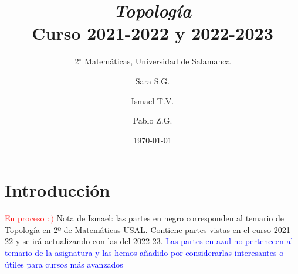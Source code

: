 \documentclass[12pt,twoside]{report}
\title{\textbf{\textit{Topología}} \\ Curso 2021-2022 y 2022-2023}
\subtitle{2$^{\circ}$ Matemáticas, Universidad de Salamanca}
\author{Sara S.G. \and Ismael T.V. \and Pablo Z.G.}
\date {\today}
\theoremstyle{azul}
\theoremstyle{azul2}
\theoremstyle{plain}
\theoremstyle{definition}
\theoremstyle{remark}
\begin{document}
\maketitle

\tableofcontents

\chapter*{Introducción}
\textcolor{red}{En proceso $:)$}\newline
Nota de Ismael: las partes en negro corresponden al temario de Topología en 2º de Matemáticas USAL. Contiene partes vistas en el curso 2021-22 y se irá actualizando con las del 2022-23.
\textcolor{blue}{Las partes en azul no pertenecen al temario de la asignatura y las hemos añadido por considerarlas interesantes o útiles para cursos más avanzados}
\pagestyle{fancy}
\newpage
\justifying
\end{document}
